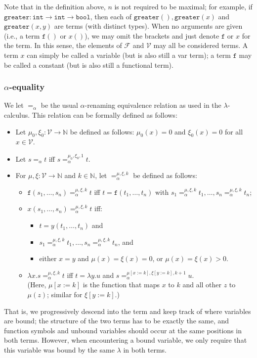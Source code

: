 \documentclass{lmcs}
\theoremstyle{theorem}\newtheorem{theorem}{Theorem}
\theoremstyle{theorem}\newtheorem{lemma}[theorem]{Lemma}
\theoremstyle{theorem}\newtheorem{corollary}[theorem]{Corollary}
\theoremstyle{definition}\newtheorem{definition}[theorem]{Definition}
\theoremstyle{definition}\newtheorem{example}[theorem]{Example}
\newcommand{\N}{\mathbb{N}}
\newcommand{\F}{\mathcal{F}}
\newcommand{\V}{\mathcal{V}}
\newcommand{\identifier}[1]{\mathtt{#1}}
\newcommand{\afun}{\identifier{f}}
\newcommand{\avar}{x}
\newcommand{\bvar}{y}
\newcommand{\cvar}{z}
\newcommand{\abs}[2]{\lambda #1.#2}
\newcommand{\arrtype}{\rightarrow}
\newcommand{\symb}[1]{\mathtt{#1}}
\newcommand{\mysubsection}[1]{\vspace{-12pt}\subsubsection{#1}}
\begin{document}
Note that in the definition above, $n$ is not required to be maximal; for example, if
$\symb{greater} : \mathtt{int} \arrtype \mathtt{int} \arrtype \mathtt{bool}$, then each of
$\symb{greater}(),\symb{greater}(\avar)$ and $\symb{greater}(\avar,\bvar)$ are terms (with
distinct types). When no arguments are given (i.e., a term $\afun()$ or $\avar()$), we may omit
the brackets and just denote $\afun$ or $\avar$ for the term.  In this sense, the elements of $\F$
and $\V$ may all be considered terms.
A term $\avar$ can simply be called a variable (but is also still a var term);
a term $\afun$ may be called a constant (but is also still a functional term).

\mysubsection{$\alpha$-equality}
We let $=_\alpha$ be the usual $\alpha$-renaming equivalence relation as used in the
$\lambda$-calculus. This relation can be formally defined as follows:
\begin{itemize}
\item Let $\mu_0,\xi_0 : \V \rightarrow \N$ be defined as follows:
  $\mu_0(\avar) = 0$ and $\xi_0(\avar) = 0$ for all $\avar \in \V$.
\item Let $s =_\alpha t$ iff $s =_\alpha^{\mu_0,\xi_0,1} t$.
\item For $\mu,\xi : \V \rightarrow \N$ and $k \in \N$, let $=_\alpha^{\mu,\xi,k}$ be defined as
  follows:
  \begin{itemize}
  \item $\afun(s_1,\dots,s_n) =_\alpha^{\mu,\xi,k} t$ iff $t = \afun(t_1,\dots,t_n)$ with $s_1
    =_\alpha^{\mu,\xi,k} t_1,\dots,s_n =_\alpha^{\mu,\xi,k} t_n$;
  \item $\avar(s_1,\dots,s_n) =_\alpha^{\mu,\xi,k} t$ iff:
    \begin{itemize}
    \item $t = \bvar(t_1,\dots,t_n)$ and
    \item $s_1 =_\alpha^{\mu,\xi,k} t_1,\dots,s_n =_\alpha^{\mu,\xi,k} t_n$, and
    \item either $\avar = \bvar$ and $\mu(\avar) = \xi(\avar) = 0$,
      or $\mu(\avar) = \xi(\avar) > 0$.
    \end{itemize}
  \item $\abs{\avar}{s} =_\alpha^{\mu,\xi,k} t$ iff
    $t = \abs{\bvar}{u}$ and $s =_\alpha^{\mu[\avar:=k],\xi[\bvar:=k],k+1} u$. \\
    (Here, $\mu[\avar:=k]$ is the function that maps $\avar$ to $k$ and all other $\cvar$ to
    $\mu(\cvar)$; similar for $\xi[\bvar:=k]$.)
  \end{itemize}
\end{itemize}
That is, we progressively descend into the term and keep track of where variables are bound; the
structure of the two terms has to be exactly the same, and function symbols and unbound variables
should occur at the same positions in both terms. However, when encountering a bound variable, we
only require that this variable was bound by the same $\lambda$ in both terms.
\end{document}
